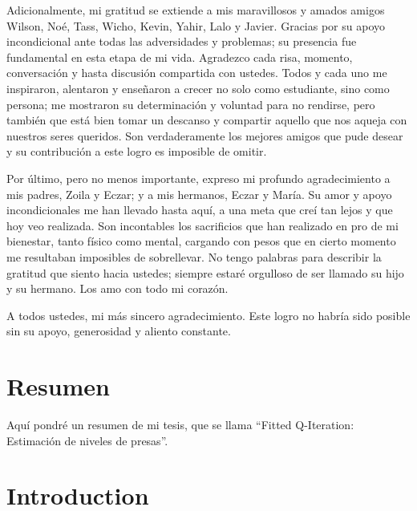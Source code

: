 \documentclass[
  spanish,
  letterpaper,
]{scrreprt}
\renewcommand*\contentsname{Tabla de contenidos}
\newcommand\contentsname{Tabla de contenidos}
\theoremstyle{definition}
\theoremstyle{remark}
\begin{document}
Adicionalmente, mi gratitud se extiende a mis maravillosos y amados amigos Wilson, Noé, Tass, Wicho, Kevin, Yahir, Lalo y Javier. Gracias por su apoyo incondicional ante todas las adversidades y problemas; su presencia fue fundamental en esta etapa de mi vida. Agradezco cada risa, momento, conversación y hasta discusión compartida con ustedes. Todos y cada uno me inspiraron, alentaron y enseñaron a crecer no solo como estudiante, sino como persona; me mostraron su determinación y voluntad para no rendirse, pero también que está bien tomar un descanso y compartir aquello que nos aqueja con nuestros seres queridos. Son verdaderamente los mejores amigos que pude desear y su contribución a este logro es imposible de omitir.

Por último, pero no menos importante, expreso mi profundo agradecimiento a mis padres, Zoila y Eczar; y a mis hermanos, Eczar y María. Su amor y apoyo incondicionales me han llevado hasta aquí, a una meta que creí tan lejos y que hoy veo realizada. Son incontables los sacrificios que han realizado en pro de mi bienestar, tanto físico como mental, cargando con pesos que en cierto momento me resultaban imposibles de sobrellevar. No tengo palabras para describir la gratitud que siento hacia ustedes; siempre estaré orgulloso de ser llamado su hijo y su hermano. Los amo con todo mi corazón.

A todos ustedes, mi más sincero agradecimiento. Este logro no habría sido posible sin su apoyo, generosidad y aliento constante.
\renewcommand*\contentsname{Tabla de contenidos}
{
\setcounter{tocdepth}{2}
\tableofcontents
}


\chapter*{Resumen}\label{resumen}


Aquí pondré un resumen de mi tesis, que se llama ``Fitted Q-Iteration:
Estimación de niveles de presas''.


\chapter*{Introduction}\label{introduction}

\end{document}

